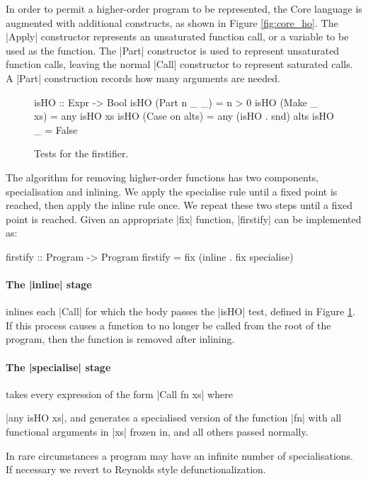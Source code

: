 In order to permit a higher-order program to be represented, the Core language is augmented with additional constructs, as shown in Figure \ref{fig:core_ho}. The |Apply| constructor represents an unsaturated function call, or a variable to be used as the function. The |Part| constructor is used to represent unsaturated function calls, leaving the normal |Call| constructor to represent saturated calls. A |Part| construction records how many arguments are needed.

\begin{figure}
\ignore\begin{code}
isHO :: Expr -> Bool
isHO (Part n _ _)    = n > 0
isHO (Make _ xs)     = any isHO xs
isHO (Case on alts)  = any (isHO . snd) alts
isHO _               = False
\end{code}
\caption{Tests for the firstifier.}
\label{fig:isHO}
\end{figure}

The algorithm for removing higher-order functions has two components, specialisation and inlining. We apply the specialise rule until a fixed point is reached, then apply the inline rule once. We repeat these two steps until a fixed point is reached. Given an appropriate |fix| function, |firstify| can be implemented as:

\ignore\begin{code}
firstify :: Program -> Program
firstify = fix (inline . fix specialise)
\end{code}

\paragraph{The |inline| stage} inlines each |Call| for which the body passes the |isHO| test, defined in Figure \ref{fig:isHO}. If this process causes a function to no longer be called from the root of the program, then the function is removed after inlining.

\paragraph{The |specialise| stage} takes every expression of the form |Call fn xs| where \ignore|any isHO xs|, and generates a specialised version of the function |fn| with all functional arguments in |xs| frozen in, and all others passed normally.

In rare circumstances a program may have an infinite number of specialisations. If necessary we revert to Reynolds style defunctionalization.

